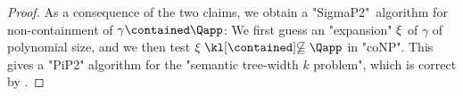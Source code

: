 \begin{proof}
  As a consequence of the two claims, we obtain a "SigmaP2"~algorithm for non-containment of $\gamma \contained \Qapp$: We first guess an "expansion" $\xi$ of $\gamma$ of polynomial size, and we then test $\anexpansion \notcontained \Qapp$ in "coNP". This gives a {"PiP2"} algorithm for the "semantic tree-width $k$ problem", which is correct by
  .
\end{proof}